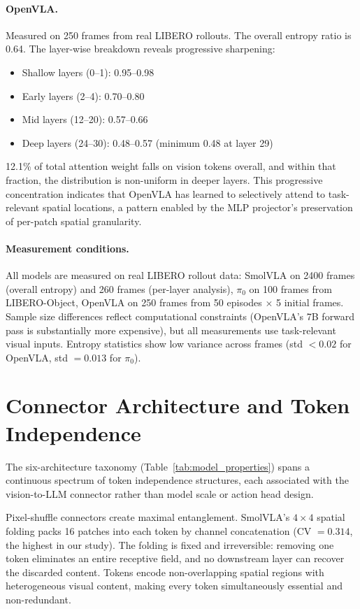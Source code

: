 \paragraph{OpenVLA.} Measured on 250 frames from real LIBERO rollouts. The overall entropy ratio is 0.64. The layer-wise breakdown reveals progressive sharpening:
\begin{itemize}[nosep]
    \item Shallow layers (0--1): 0.95--0.98
    \item Early layers (2--4): 0.70--0.80
    \item Mid layers (12--20): 0.57--0.66
    \item Deep layers (24--30): 0.48--0.57 (minimum 0.48 at layer 29)
\end{itemize}
12.1\% of total attention weight falls on vision tokens overall, and within that fraction, the distribution is non-uniform in deeper layers. This progressive concentration indicates that OpenVLA has learned to selectively attend to task-relevant spatial locations, a pattern enabled by the MLP projector's preservation of per-patch spatial granularity.

\paragraph{Measurement conditions.} All models are measured on real LIBERO rollout data: SmolVLA on 2400 frames (overall entropy) and 260 frames (per-layer analysis), $\pi_{0}$ on 100 frames from LIBERO-Object, OpenVLA on 250 frames from 50 episodes $\times$ 5 initial frames. Sample size differences reflect computational constraints (OpenVLA's 7B forward pass is substantially more expensive), but all measurements use task-relevant visual inputs. Entropy statistics show low variance across frames (std $< 0.02$ for OpenVLA, std $= 0.013$ for $\pi_{0}$).


\section{Connector Architecture and Token Independence}
\label{app:connector_analysis}

The six-architecture taxonomy (Table~\ref{tab:model_properties}) spans a continuous spectrum of token independence structures, each associated with the vision-to-LLM connector rather than model scale or action head design.

Pixel-shuffle connectors create maximal entanglement. SmolVLA's $4 \times 4$ spatial folding packs 16 patches into each token by channel concatenation (CV $= 0.314$, the highest in our study). The folding is fixed and irreversible: removing one token eliminates an entire receptive field, and no downstream layer can recover the discarded content. Tokens encode non-overlapping spatial regions with heterogeneous visual content, making every token simultaneously essential and non-redundant.

